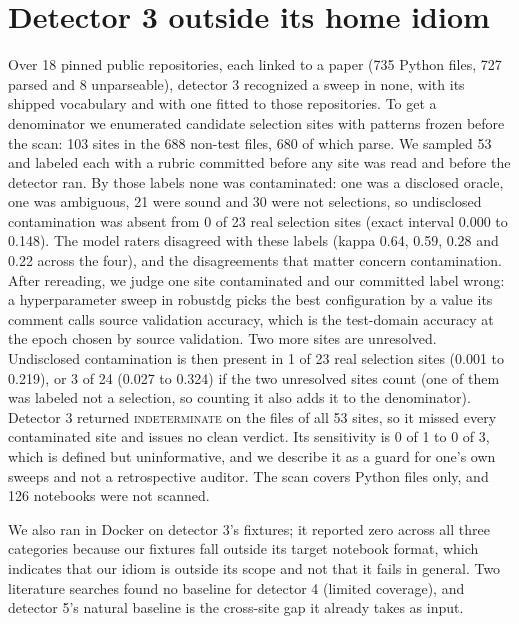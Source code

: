 \documentclass[10pt]{article}
\theoremstyle{definition}
\begin{document}
\section{Detector 3 outside its home idiom}
\label{sec:detector3}

Over 18 pinned public repositories, each linked to a paper (735 Python files, 727 parsed and 8 unparseable), detector 3 recognized a sweep in none, with its shipped vocabulary and with one fitted to those repositories. To get a denominator we enumerated candidate selection sites with patterns frozen before the scan: 103 sites in the 688 non-test files, 680 of which parse. We sampled 53 and labeled each with a rubric committed before any site was read and before the detector ran. By those labels none was contaminated: one was a disclosed oracle, one was ambiguous, 21 were sound and 30 were not selections, so undisclosed contamination was absent from 0 of 23 real selection sites (exact interval 0.000 to 0.148). The model raters disagreed with these labels (kappa 0.64, 0.59, 0.28 and 0.22 across the four), and the disagreements that matter concern contamination. After rereading, we judge one site contaminated and our committed label wrong: a hyperparameter sweep in robustdg picks the best configuration by a value its comment calls source validation accuracy, which is the test-domain accuracy at the epoch chosen by source validation. Two more sites are unresolved. Undisclosed contamination is then present in 1 of 23 real selection sites (0.001 to 0.219), or 3 of 24 (0.027 to 0.324) if the two unresolved sites count (one of them was labeled not a selection, so counting it also adds it to the denominator). Detector 3 returned \textsc{indeterminate} on the files of all 53 sites, so it missed every contaminated site and issues no clean verdict. Its sensitivity is 0 of 1 to 0 of 3, which is defined but uninformative, and we describe it as a guard for one's own sweeps and not a retrospective auditor. The scan covers Python files only, and 126 notebooks were not scanned.

We also ran \citet{yang2022leakage} in Docker on detector 3's fixtures; it reported zero across all three categories because our fixtures fall outside its target notebook format, which indicates that our idiom is outside its scope and not that it fails in general. Two literature searches found no baseline for detector 4 (limited coverage), and detector 5's natural baseline is the cross-site gap it already takes as input.
\end{document}
